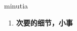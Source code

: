
\begin{frame}
{\huge minutia}
\begin{center}
\begin{enumerate}\Large
  \item \textbf{次要的细节，小事}
\end{enumerate}
\end{center}
\end{frame}
